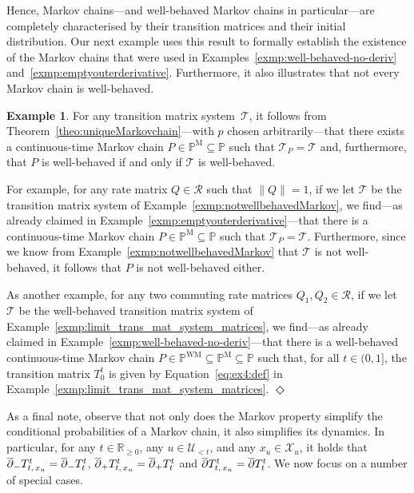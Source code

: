 \documentclass[10pt,a4paper]{paper}
\theoremstyle{definition}
\newtheorem{exmp}{Example}%
\newcommand{\reals}{\mathbb{R}}
\newcommand{\realsnonneg}{\reals_{\geq 0}}
\newcommand{\states}{\mathcal{X}}
\newcommand{\processes}{\mathbb{P}}
\newcommand{\mprocesses}{\processes^{\mathrm{M}}}
\newcommand{\wmprocesses}{\processes^{\mathrm{WM}}}
\newcommand{\norm}[1]{\left\lVert #1 \right\rVert}
\newcommand{\exampleend}{\hfill$\Diamond$}
\begin{document}
Hence, Markov chains---and well-behaved Markov chains in particular---are completely characterised by their transition matrices and their initial distribution. Our next example uses this result to formally establish the existence of the Markov chains that were used in Examples~\ref{exmp:well-behaved-no-deriv} and~\ref{exmp:emptyouterderivative}. Furthermore, it also illustrates that not every Markov chain is well-behaved.

\begin{exmp}\label{exmp:twoexamplesofMarkovchains}
For any transition matrix system~$\mathcal{T}$, it follows from Theorem~\ref{theo:uniqueMarkovchain}---with $p$ chosen arbitrarily---that there exists a continuous-time Markov chain $P\in\mprocesses\subseteq\processes$ such that $\mathcal{T}_P=\mathcal{T}$ and, furthermore, that $P$ is well-behaved if and only if $\mathcal{T}$ is well-behaved.

For example, for any rate matrix $Q\in\mathcal{R}$ such that $\norm{Q}=1$, if we let $\mathcal{T}$ be the transition matrix system of Example~\ref{exmp:notwellbehavedMarkov}, we find---as already claimed in Example~\ref{exmp:emptyouterderivative}---that there is a continuous-time Markov chain $P\in\mprocesses\subseteq\processes$ such that $\mathcal{T}_P=\mathcal{T}$. Furthermore, since we know from Example~\ref{exmp:notwellbehavedMarkov} that $\mathcal{T}$ is not well-behaved, it follows that $P$ is not well-behaved either.

As another example, for any two commuting rate matrices $Q_1,Q_2\in\mathcal{R}$, if we let $\mathcal{T}$ be the well-behaved transition matrix system of Example~\ref{exmp:limit_trans_mat_system_matrices}, we find---as already claimed in Example~\ref{exmp:well-behaved-no-deriv}---that there is a well-behaved continuous-time Markov chain $P\in\wmprocesses\subseteq\mprocesses\subseteq\processes$ such that, for all $t\in(0,1]$, the transition matrix $T_0^t$ is given by Equation~\eqref{eq:ex4:def} in Example~\ref{exmp:limit_trans_mat_system_matrices}.
\exampleend
\end{exmp}

As a final note, observe that not only does the Markov property simplify the conditional probabilities of a Markov chain, it also simplifies its dynamics. In particular, for any $t\in\realsnonneg$, any $u\in\mathcal{U}_{<t}$, and any $x_u\in\states_u$, it holds that $\smash{\overline{\partial}_-}T_{t,\,x_u}^t=\smash{\overline{\partial}_-}T_{t}^t$, $\smash{\overline{\partial}_+}T_{t,\,x_u}^t=\smash{\overline{\partial}_+}T_{t}^t$ and $\smash{\overline{\partial}}T_{t,\,x_u}^t=\smash{\overline{\partial}}T_{t}^t$. We now focus on a number of special cases.
\end{document}
